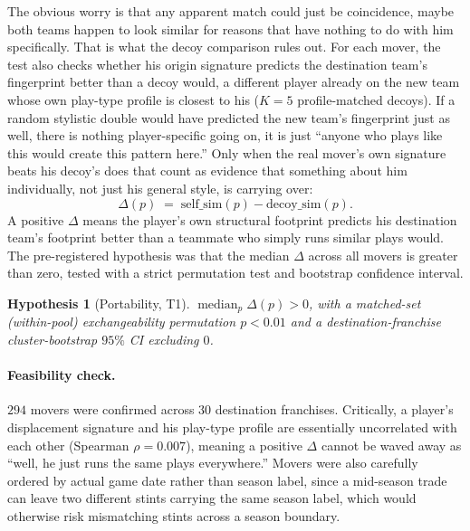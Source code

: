 \documentclass[11pt]{article}
\newtheorem{hypothesis}{Hypothesis}
\begin{document}
The obvious worry is that any apparent match could just be coincidence, maybe both teams
happen to look similar for reasons that have nothing to do with him specifically. That is
what the decoy comparison rules out. For each mover, the test also checks whether his
origin signature predicts the destination team's fingerprint better than a decoy would, a
different player already on the new team whose own play-type profile is closest to his
($K=5$ profile-matched decoys). If a random stylistic double would have predicted the new
team's fingerprint just as well, there is nothing player-specific going on, it is just
``anyone who plays like this would create this pattern here.'' Only when the real mover's
own signature beats his decoy's does that count as evidence that something about him
individually, not just his general style, is carrying over:
\begin{equation}
\label{eq:portability}
\Delta(p) \;=\; \text{self\_sim}(p)-\text{decoy\_sim}(p).
\end{equation}
A positive $\Delta$ means the player's own structural footprint predicts his destination
team's footprint better than a teammate who simply runs similar plays would. The
pre-registered hypothesis was that the median $\Delta$ across all movers is greater than
zero, tested with a strict permutation test and bootstrap confidence interval.
\begin{hypothesis}[Portability, T1]
\label{hyp:port}
$\operatorname{median}_p \Delta(p)>0$, with a matched-set (within-pool) exchangeability
permutation $p<0.01$ and a destination-franchise cluster-bootstrap $95\%$ CI excluding $0$.
\end{hypothesis}

\paragraph{Feasibility check.}
$294$ movers were confirmed across $30$ destination franchises. Critically, a player's
displacement signature and his play-type profile are essentially uncorrelated with each
other (Spearman $\rho=0.007$), meaning a positive $\Delta$ cannot be waved away as ``well,
he just runs the same plays everywhere.'' Movers were also carefully ordered by actual
game date rather than season label, since a mid-season trade can leave two different
stints carrying the same season label, which would otherwise risk mismatching stints
across a season boundary.
\end{document}

